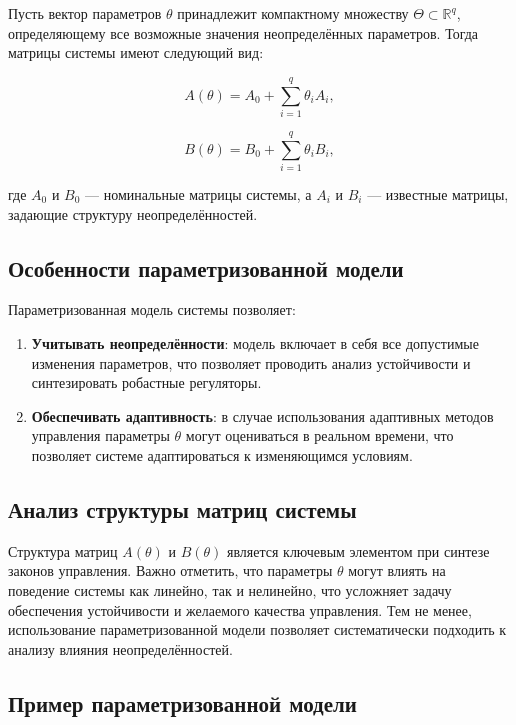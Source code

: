 \documentclass[a4paper,14pt]{extarticle} %
\begin{document}
Пусть вектор параметров \( \theta \) принадлежит компактному множеству \( \Theta \subset \mathbb{R}^q \), определяющему все возможные значения неопределённых параметров. Тогда матрицы системы имеют следующий вид:

\begin{equation}
    A(\theta) = A_0 + \sum_{i=1}^q \theta_i A_i,
\end{equation}

\begin{equation}
    B(\theta) = B_0 + \sum_{i=1}^q \theta_i B_i,
\end{equation}

где \( A_0 \) и \( B_0 \) — номинальные матрицы системы, а \( A_i \) и \( B_i \) — известные матрицы, задающие структуру неопределённостей.

\subsection*{Особенности параметризованной модели}

Параметризованная модель системы позволяет:

\begin{enumerate}
    \item \textbf{Учитывать неопределённости}: модель включает в себя все допустимые изменения параметров, что позволяет проводить анализ устойчивости и синтезировать робастные регуляторы.
    \item \textbf{Обеспечивать адаптивность}: в случае использования адаптивных методов управления параметры \( \theta \) могут оцениваться в реальном времени, что позволяет системе адаптироваться к изменяющимся условиям.
\end{enumerate}

\subsection*{Анализ структуры матриц системы}

Структура матриц \( A(\theta) \) и \( B(\theta) \) является ключевым элементом при синтезе законов управления. Важно отметить, что параметры \( \theta \) могут влиять на поведение системы как линейно, так и нелинейно, что усложняет задачу обеспечения устойчивости и желаемого качества управления. Тем не менее, использование параметризованной модели позволяет систематически подходить к анализу влияния неопределённостей.

\subsection*{Пример параметризованной модели}
\end{document}
